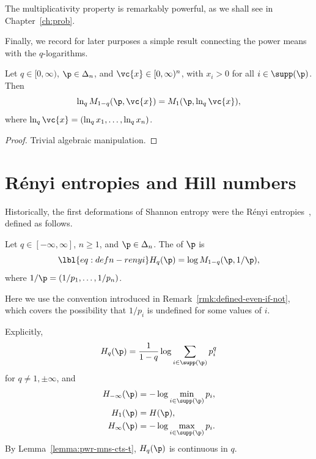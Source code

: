 The multiplicativity property is remarkably powerful, as we shall see in
Chapter~\ref{ch:prob}.

Finally, we record for later purposes a simple result connecting the power
means with the $q$-logarithms.

\begin{lemma}
Let $q \in [0, \infty)$, $\p \in \Delta_n$, and $\vc{x} \in [0, \infty)^n$,
    with $x_i > 0$ for all $i \in \supp(\p)$.  Then
\[
\ln_q M_{1 - q} (\p, \vc{x}) = M_1(\p, \ln_q \vc{x}),
\]
where $\ln_q \vc{x} = (\ln_q x_1, \ldots, \ln_q x_n)$. 
\end{lemma}

\begin{proof}
Trivial algebraic manipulation.
\end{proof}



\section{R\'enyi entropies and Hill numbers}

Historically, the first deformations of Shannon entropy were the R\'enyi
entropies~\cite{Reny}, defined as follows.

\begin{defn}
% 
Let $q \in [-\infty, \infty]$, $n \geq 1$, and $\p \in \Delta_n$.  The
 of $\p$ is
% 
\begin{equation}
\lbl{eq:defn-renyi}
H_q(\p) = \log M_{1 - q}(\p, 1/\p),
\end{equation}
% 
where $1/\p = (1/p_1, \ldots, 1/p_n)$.
\end{defn}

Here we use the convention introduced in
Remark~\ref{rmk:defined-even-if-not}, which covers the possibility that
$1/p_i$ is undefined for some values of $i$.

Explicitly,
\[
H_q(\p) 
=
\frac{1}{1 - q} \log \sum_{i \in \supp(\p)} p_i^q
\]
for $q \neq 1, \pm\infty$, and
% 
\begin{align*}
H_{-\infty}(\p) &
=
-\log\min_{i \in \supp(\p)} p_i,        \\
H_1(\p) &
=
H(\p),  \\
H_\infty(\p)    &
=
-\log\max_{i \in \supp(\p)} p_i.
\end{align*}
% 
By Lemma~\ref{lemma:pwr-mns-cts-t}, $H_q(\p)$ is continuous in $q$.


